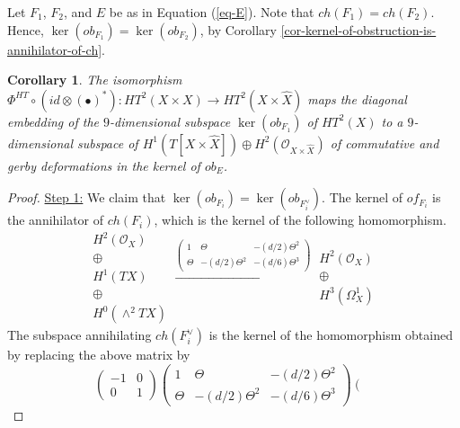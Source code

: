 \documentclass[12pt]{amsart}
\numberwithin{equation}{subsection}
\theoremstyle{plain}
\newtheorem{cor}[thm]{Corollary}
\theoremstyle{definition}
\newcommand{\LongRightArrowOf}[1]{\stackrel{#1}{\longrightarrow}}
\newcommand{\StructureSheaf}[1]{{\mathcal O}_{#1}}
\begin{document}
Let $F_1$, $F_2$, and $E$ be as in Equation (\ref{eq-E}). Note that $ch(F_1)=ch(F_2)$. Hence, $\ker(ob_{F_1})=\ker(ob_{F_2})$, by Corollary \ref{cor-kernel-of-obstruction-is-annihilator-of-ch}.

\begin{cor}
\label{cor-Orlov's-equivalence-maps-diagonal-deformations-to-commutative-gerby-ones}
The isomorphism $\Phi^{HT}\circ (id\otimes(\bullet)^*):HT^2(X\times X)\rightarrow HT^2(X\times\hat{X})$ maps the diagonal embedding of the $9$-dimensional subspace $\ker(ob_{F_1})$ of $HT^2(X)$ to 
a $9$-dimensional subspace of $H^1(T[X\times\hat{X}])\oplus H^2(\StructureSheaf{X\times\hat{X}})$ of commutative and gerby deformations in the kernel of $ob_E$.
\end{cor}

\begin{proof}
\underline{Step 1:}
We claim that $\ker(ob_{F_i})=\ker(ob_{F_i^\vee})$. The kernel of $of_{F_i}$ is the annihilator of $ch(F_i)$, which is the kernel of the following homomorphism.
\[
\begin{array}{c}
H^2(\StructureSheaf{X})\\
\oplus\\
H^1(TX)\\
\oplus\\
H^0(\wedge^2TX)
\end{array}
\LongRightArrowOf{\left(
\begin{array}{ccc}
1&\Theta&-(d/2)\Theta^2
\\
\Theta & -(d/2)\Theta^2&-(d/6)\Theta^3
\end{array}
\right)}
\begin{array}{c}
H^2(\StructureSheaf{X}) \\ \oplus \\ H^3(\Omega^1_X)
\end{array}
\]
The subspace annihilating $ch(F_i^\vee)$ is the kernel of the homomorphism obtained by replacing the above matrix by
\[
\left(
\begin{array}{cc}
-1 & 0\\
0&1
\end{array}
\right)
\left(
\begin{array}{ccc}
1&\Theta&-(d/2)\Theta^2
\\
\Theta & -(d/2)\Theta^2&-(d/6)\Theta^3
\end{array}
\right)
\left(
\begin{array}{ccc}

\end{array}\]
\end{proof}
\end{document}
